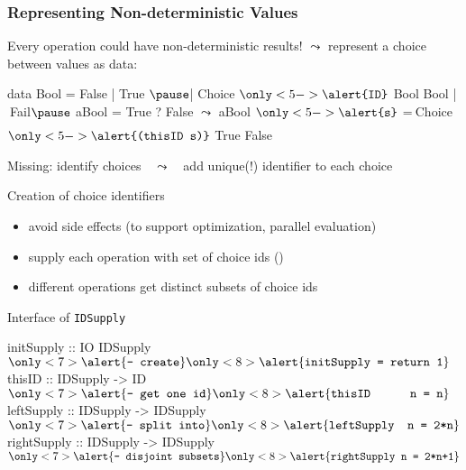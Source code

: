 \documentclass[10pt]{beamer}
\newcommand{\listline}{\vrule width0pt depth1.75ex}
\begin{document}
\begin{frame}[fragile]
\frametitle{Representing Non-deterministic Values}

\begin{block}{Every operation could have non-deterministic results!}
$\leadsto$ represent a choice between values as data:
\begin{curry}
data Bool = False | True $\pause$| Choice $\only<5->{\texttt{\alert{ID}}}$ Bool Bool | $~$Fail$\listline\pause$
aBool = True ? False $\leadsto$  aBool $\only<5->{\texttt{\alert{s}}}$ =$~$Choice $\only<5->{\texttt{\alert{(thisID s)}}}$ True False
\end{curry}
\pause
Missing: \alert{identify choices}\pause~~$\leadsto$~~add unique(!) identifier to each choice
\end{block}
\pause
\vfill
\begin{block}{Creation of choice identifiers}
\begin{itemize}
\item avoid side effects (to support optimization, parallel evaluation)
\item supply each operation with \alert{set of choice ids} ()
\item different operations get distinct subsets of choice ids
\end{itemize}
\end{block}
\vfill\pause

\begin{exampleblock}{Interface of {\tt IDSupply}}
\vspace{-1ex}
\begin{curry}
initSupply  :: IO IDSupply            $\only<7>{\alert{\mbox{\tt{-- create}}}}\only<8>{\alert{\mbox{\tt{initSupply = return 1}}}}$
thisID      :: IDSupply -> ID        $\only<7>{\alert{\mbox{\tt{-- get one id}}}}\only<8>{\alert{\mbox{\tt{thisID~~~~~ n = n}}}}$
leftSupply  :: IDSupply -> IDSupply  $\only<7>{\alert{\mbox{\tt{-- split into}}}}\only<8>{\alert{\mbox{\tt{leftSupply~ n = 2*n}}}}$
rightSupply :: IDSupply -> IDSupply  $\only<7>{\alert{\mbox{\tt{-- disjoint subsets}}}}\only<8>{\alert{\mbox{\tt{rightSupply n = 2*n+1}}}}$
\end{curry}
\end{exampleblock}

\end{frame}
\end{document}
